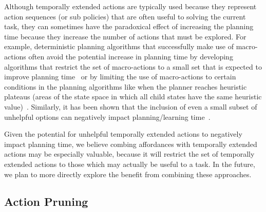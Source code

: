 \documentclass[]{article}
\newcommand{\jmnote}[1]{\textcolor{Green}{\textbf{JM: #1}}}
\begin{document}
Although temporally extended actions are typically used
because they represent action sequences (or sub policies) that are often useful to solving
the current task, they can sometimes have the paradoxical effect
of increasing the planning time because they increase the number of actions that must be explored.
For example, deterministic planning algorithms that successfully make use of macro-actions often avoid the potential increase
in planning time by developing algorithms that restrict the set of macro-actions to a small set that is expected to improve planning time~\cite{Botea:2005kx,Newton:2005vn} or by limiting the use of macro-actions to certain conditions
in the planning algorithms like when the planner reaches heuristic plateaus (areas of the state space in which all child states have the same heuristic value)~\cite{Coles:2007ys}. Similarly, it has been shown that the inclusion
of even a small subset of unhelpful options can negatively impact planning/learning time~\cite{Jong:2008zr}.

Given the potential for unhelpful temporally extended actions to negatively impact planning time, we believe combing affordances with temporally extended actions
may be especially valuable, because it will restrict the set of temporally extended actions to those
which may actually be useful to a task. In the future, we plan to more directly explore the benefit from combining
these approaches.



\subsection{Action Pruning}

\end{document}
